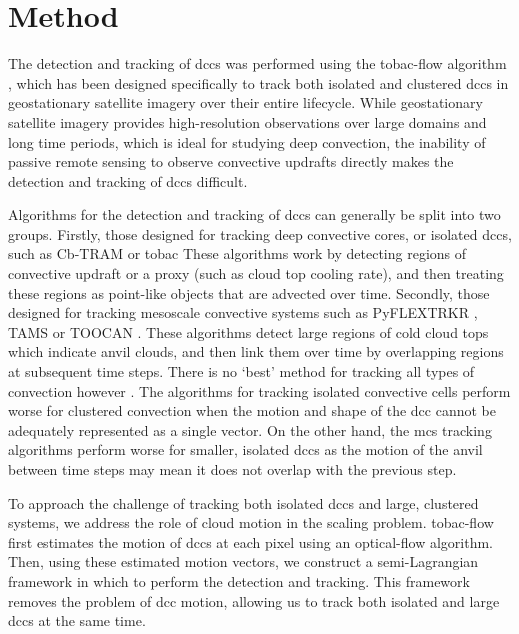 \section{Method}

The detection and tracking of \acrshort{dcc}s was performed using the tobac-flow algorithm \citep{jones_semi-lagrangian_2023}, which has been designed specifically to track both isolated and clustered \acrshort{dcc}s in geostationary satellite imagery over their entire lifecycle. 
While geostationary satellite imagery provides high-resolution observations over large domains and long time periods, which is ideal for studying deep convection, the inability of passive remote sensing to observe convective updrafts directly makes the detection and tracking of \acrshort{dcc}s difficult.

Algorithms for the detection and tracking of \acrshort{dcc}s can generally be split into two groups. 
Firstly, those designed for tracking deep convective cores, or isolated \acrshort{dcc}s, such as Cb-TRAM \citep{zinner_cb-tram_2008,zinner_validation_2013} or tobac \citep{heikenfeld_tobac_2019}
These algorithms work by detecting regions of convective updraft or a proxy (such as cloud top cooling rate), and then treating these regions as point-like objects that are advected over time. 
Secondly, those designed for tracking mesoscale convective systems such as PyFLEXTRKR \citep{feng_pyflextrkr_2022}, TAMS \citep{ocasio_tracking_2020} or TOOCAN \citep{fiolleau_algorithm_2013}. 
These algorithms detect large regions of cold cloud tops which indicate anvil clouds, and then link them over time by overlapping regions at subsequent time steps. 
There is no `best' method for tracking all types of convection however \citep{lakshmanan_objective_2010}. 
The algorithms for tracking isolated convective cells perform worse for clustered convection when the motion and shape of the \acrshort{dcc} cannot be adequately represented as a single vector. 
On the other hand, the \acrshort{mcs} tracking algorithms perform worse for smaller, isolated \acrshort{dcc}s as the motion of the anvil between time steps may mean it does not overlap with the previous step.

To approach the challenge of tracking both isolated \acrshort{dcc}s and large, clustered systems, we address the role of cloud motion in the scaling problem. 
tobac-flow first estimates the motion of \acrshort{dcc}s at each pixel using an optical-flow algorithm. 
Then, using these estimated motion vectors, we construct a semi-Lagrangian framework in which to perform the detection and tracking. 
This framework removes the problem of \acrshort{dcc} motion, allowing us to track both isolated and large \acrshort{dcc}s at the same time.

